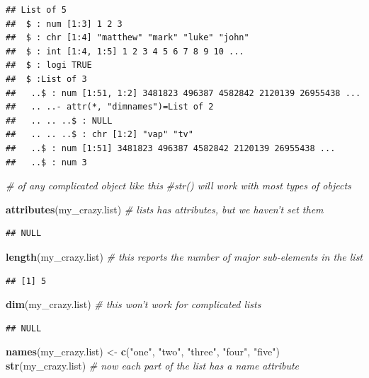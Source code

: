 \documentclass[]{article}
\newenvironment{Shaded}{\begin{snugshade}}{\end{snugshade}}
\newcommand{\KeywordTok}[1]{\textcolor[rgb]{0.13,0.29,0.53}{\textbf{#1}}}
\newcommand{\StringTok}[1]{\textcolor[rgb]{0.31,0.60,0.02}{#1}}
\newcommand{\CommentTok}[1]{\textcolor[rgb]{0.56,0.35,0.01}{\textit{#1}}}
\newcommand{\NormalTok}[1]{#1}
\begin{document}
\begin{verbatim}
## List of 5
##  $ : num [1:3] 1 2 3
##  $ : chr [1:4] "matthew" "mark" "luke" "john"
##  $ : int [1:4, 1:5] 1 2 3 4 5 6 7 8 9 10 ...
##  $ : logi TRUE
##  $ :List of 3
##   ..$ : num [1:51, 1:2] 3481823 496387 4582842 2120139 26955438 ...
##   .. ..- attr(*, "dimnames")=List of 2
##   .. .. ..$ : NULL
##   .. .. ..$ : chr [1:2] "vap" "tv"
##   ..$ : num [1:51] 3481823 496387 4582842 2120139 26955438 ...
##   ..$ : num 3
\end{verbatim}

\begin{Shaded}
\begin{Highlighting}[]
\CommentTok{# of any complicated object like this}
\CommentTok{#str() will work with most types of objects}

\KeywordTok{attributes}\NormalTok{(my_crazy.list) }\CommentTok{# lists has attributes, but we haven't set them}
\end{Highlighting}
\end{Shaded}

\begin{verbatim}
## NULL
\end{verbatim}

\begin{Shaded}
\begin{Highlighting}[]
\KeywordTok{length}\NormalTok{(my_crazy.list) }\CommentTok{# this reports the number of major sub-elements in the list}
\end{Highlighting}
\end{Shaded}

\begin{verbatim}
## [1] 5
\end{verbatim}

\begin{Shaded}
\begin{Highlighting}[]
\KeywordTok{dim}\NormalTok{(my_crazy.list) }\CommentTok{# this won't work for complicated lists}
\end{Highlighting}
\end{Shaded}

\begin{verbatim}
## NULL
\end{verbatim}

\begin{Shaded}
\begin{Highlighting}[]
\KeywordTok{names}\NormalTok{(my_crazy.list) <-}\StringTok{ }\KeywordTok{c}\NormalTok{(}\StringTok{"one"}\NormalTok{, }\StringTok{"two"}\NormalTok{, }\StringTok{"three"}\NormalTok{, }\StringTok{"four"}\NormalTok{, }\StringTok{"five"}\NormalTok{)}
\KeywordTok{str}\NormalTok{(my_crazy.list) }\CommentTok{# now each part of the list has a name attribute}
\end{Highlighting}
\end{Shaded}
\end{document}
